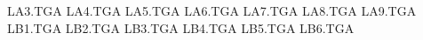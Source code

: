 LA3.TGA
LA4.TGA
LA5.TGA
LA6.TGA
LA7.TGA
LA8.TGA
LA9.TGA
LB1.TGA
LB2.TGA
LB3.TGA
LB4.TGA
LB5.TGA
LB6.TGA